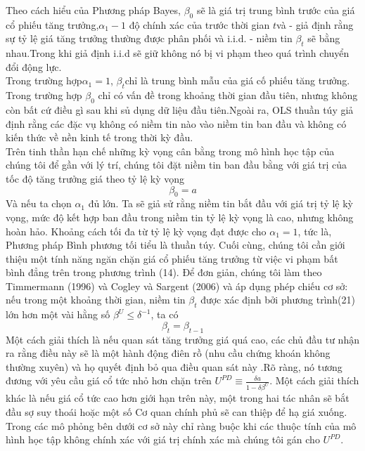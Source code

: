 \documentclass[10pt,a4paper]{article}
\begin{document}
	Theo cách hiểu của Phương pháp Bayes, $\beta_0$ sẽ là giá trị trung bình trước của giá cổ phiếu tăng trưởng,$\alpha_{1}-1$ độ chính xác của trước thời gian $t$và - giả định rằng sự tỷ lệ giá  tăng trưởng thường được phân phối và i.i.d. - niềm tin $\beta_t$ sẽ bằng nhau.Trong khi giả định i.i.d sẽ giữ không  nó bị vi phạm theo quá trình chuyển đổi
	động lực.\\
	Trong trường hợp$\alpha_1=1$, $\beta_t$chỉ là trung bình mẫu của giá cố phiếu tăng trưởng. Trong trường hợp $\beta_0$
	chỉ có vấn đề trong khoảng thời gian đầu tiên, nhưng không còn bất cứ điều gì sau khi sủ dụng dữ liệu đầu tiên.Ngoài ra, OLS thuần túy giả định rằng các đặc vụ không có niềm tin nào vào  niềm tin ban đầu và không có kiến thức về nền kinh tế trong thời kỳ đầu.\\
	Trên tinh thần hạn chế những kỳ vọng cân bằng trong mô hình học tập của chúng tôi để
	gần với lý trí, chúng tôi đặt niềm tin ban đầu bằng với giá trị của tốc độ tăng trưởng
	giá theo tỷ lệ kỳ vọng
	$$\beta_0=a$$
	Và nếu ta chọn $\alpha_1$ đủ lớn. Ta sẽ giả sử rằng niềm tin bắt đầu với giá trị tỷ lệ kỳ vọng, mức độ kết hợp ban đầu trong niềm tin tỷ lệ kỳ vọng là cao, nhưng không hoàn hảo. Khoảng cách tối đa từ tỷ lệ kỳ vọng đạt được cho $\alpha_1=1$, tức là, Phương pháp Bình phương tối tiểu là thuần túy. Cuối cùng, chúng tôi cần giới thiệu một tính năng ngăn chặn giá cổ phiếu tăng trưởng từ việc vi phạm bất bình đẳng trên trong phương trình (14). Để đơn giản, chúng tôi làm theo Timmermann (1996) và Cogley và Sargent (2006) và áp dụng phép chiếu cơ sở: nếu trong một khoảng thời gian, niềm tin $\beta_t$ được xác định bởi phương trình(21) lớn hơn một vài hằng số $\beta^U \le \delta^{-1}$, ta có
	\begin{equation}
	\beta_t=\beta_{t-1}
	\end{equation}
	Một cách giải thích là nếu quan sát tăng trưởng giá quá cao, các chủ đầu tư nhận ra rằng điều này sẽ là một hành động điên rồ (nhu cầu chứng khoán không thường xuyên) và họ quyết định bỏ qua điều quan sát này .Rõ ràng, nó tương đương với yêu cầu giá cổ tức nhỏ hơn chặn trên $U^{PD}\equiv \frac{\delta a}{1- \delta\beta^U}$. Một cách giải thích khác là nếu giá cổ tức cao hơn giới hạn trên này, một trong hai tác nhân sẽ bắt đầu sợ suy thoái hoặc một số Cơ quan chính phủ sẽ can thiệp để hạ giá xuống. Trong các mô phỏng
	bên dưới cơ sở này chỉ ràng buộc khi các thuộc tính của mô hình học tập không chính xác với giá trị chính xác mà chúng tôi gán cho $U^{PD}.$
\end{document}

